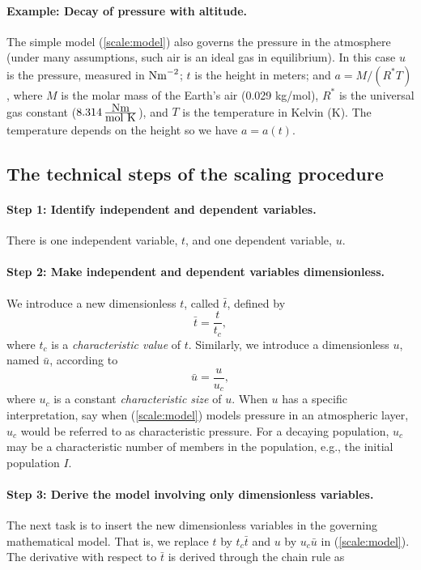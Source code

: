 \documentclass[graybox,envcountchap,sectrefs,final]{svmonodo}
\begin{document}
\paragraph{Example: Decay of pressure with altitude.}
The simple model (\ref{scale:model}) also governs the pressure
in the atmosphere (under many assumptions, such air is an ideal gas in
equilibrium). In this case $u$ is the
pressure, measured in $\hbox{Nm}^{-2}$; $t$ is the height in meters;
and $a=M/(R^*T)$, where
$M$ is the molar mass of the Earth's air (0.029 kg/mol),
$R^*$ is the universal
gas constant ($8.314\,\frac{\hbox{Nm}}{\hbox{mol K}}$),
and $T$ is the temperature in Kelvin (K).
The temperature depends on the height so we have $a=a(t)$.


\subsection{The technical steps of the scaling procedure}
\label{sec:scale:steps}

\paragraph{Step 1: Identify independent and dependent variables.}
There is one independent variable, $t$, and one dependent variable,
$u$.


\paragraph{Step 2: Make independent and dependent variables dimensionless.}
We introduce a new dimensionless $t$, called $\bar t$, defined by
\begin{equation}
\bar t = \frac{t}{t_c},
\end{equation}
where $t_c$ is a \emph{characteristic value} of $t$. Similarly,
we introduce a dimensionless $u$, named $\bar u$, according to
\begin{equation}
\bar u = \frac{u}{u_c},
\end{equation}
where $u_c$ is a constant \emph{characteristic size} of $u$. When $u$ has a specific
interpretation, say when (\ref{scale:model}) models pressure
in an atmospheric layer, $u_c$ would be referred to as characteristic pressure.
For a decaying population, $u_c$ may be a characteristic number of
members in the population, e.g., the initial population $I$.

\paragraph{Step 3: Derive the model involving only dimensionless variables.}
The next task is to insert the new dimensionless variables in the
governing mathematical model. That is, we replace $t$ by $t_c\bar t$
and $u$ by $u_c\bar u$ in (\ref{scale:model}). The derivative
with respect to $\bar t$ is derived through the chain rule as
\end{document}
